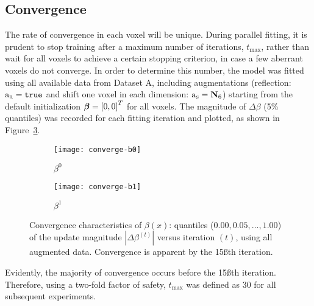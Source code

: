 \subsection{Convergence}
The rate of convergence in each voxel will be unique.
During parallel fitting, it is prudent to stop training after
a maximum number of iterations, $t_{\max}$,
rather than wait for all voxels to achieve a certain stopping criterion,
in case a few aberrant voxels do not converge.
In order to determine this number, the model was fitted
using all available data from Dataset A, including augmentations
(reflection: $\mathrm{a}_{\textsc{r}} = \texttt{true}$ and
shift one voxel in each dimension: $\mathrm{a}_{\textsc{s}} = \mathbf{N}_6$)
starting from the default initialization $\bm{\beta} = {[0,0]}^T$ for all voxels.
The magnitude of $\Delta\beta$ (5\% quantiles)
was recorded for each fitting iteration and plotted,
as shown in Figure~\ref{fig:converge}.
\par
\begin{figure}
  \centering
  \begin{subfigure}{\plotwidth}
    \centering
    \texttt{[image: converge-b0]}
    \caption{$\beta^0$}%
    \label{fig:converge-b0}
  \end{subfigure}
  \begin{subfigure}{\plotwidth}
    \centering
    \texttt{[image: converge-b1]}
    \caption{$\beta^1$}%
    \label{fig:converge-b1}
  \end{subfigure}
  \caption{Convergence characteristics of $\beta(x)$:
    quantiles ($0.00, 0.05, \dots, 1.00$) of the update magnitude $\left|\Delta\beta^{(t)}\right|$
    versus iteration $(t)$,
    using all augmented data.
    Convergence is apparent by the 15\ss{th} iteration.}%
  \label{fig:converge}
\end{figure}
Evidently, the majority of convergence occurs before the 15\ss{th} iteration.
Therefore, using a two-fold factor of safety, $t_{\max}$ was defined as 30
for all subsequent experiments.
